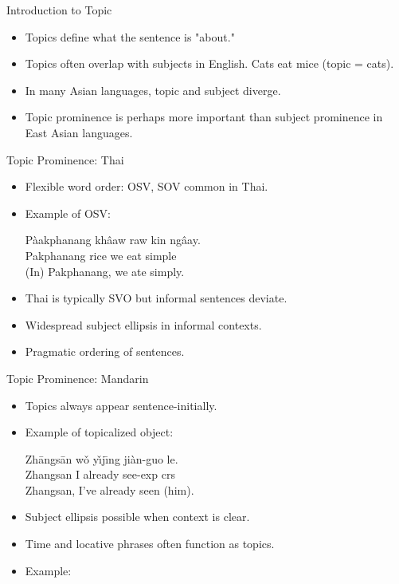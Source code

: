 \documentclass{beamer}
\begin{document}
\begin{frame}{Introduction to Topic}
  \begin{itemize}
    \item Topics define what the sentence is "about."
    \item Topics often overlap with subjects in English.
      \ex
      Cats eat mice (topic = cats).
      \xe
    \item In many Asian languages, topic and subject diverge.
    \item Topic prominence is perhaps more important than subject prominence in East Asian languages.
  \end{itemize}
\end{frame}

\begin{frame}{Topic Prominence: Thai}
  \begin{itemize}
    \item Flexible word order: OSV, SOV common in Thai.
    \item Example of OSV:
    \begin{example}
    \gll Pàakphanang khâaw raw kin ngâay. \\
         Pakphanang rice we eat simple \\
    \trans (In) Pakphanang, we ate simply.
    \end{example}
    \item Thai is typically SVO but informal sentences deviate.
    \item Widespread subject ellipsis in informal contexts.
    \item Pragmatic ordering of sentences.
  \end{itemize}
\end{frame}

\begin{frame}{Topic Prominence: Mandarin}
  \begin{itemize}
    \item Topics always appear sentence-initially.
    \item Example of topicalized object:
    \begin{example}
    \gll Zhāngsān wǒ yı̌jı̄ng jiàn-guo le. \\
         Zhangsan I already see-exp crs \\
    \trans Zhangsan, I've already seen (him).
    \end{example}
    \item Subject ellipsis possible when context is clear.
    \item Time and locative phrases often function as topics.
    \item Example: 
  \end{itemize}
\end{frame}
\end{document}
